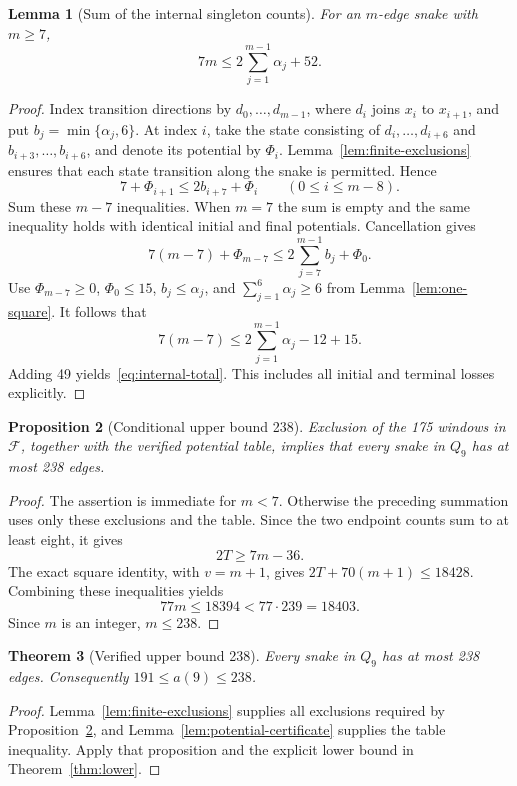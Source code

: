 \documentclass[11pt,a4paper]{article}
\newtheorem{theorem}{Theorem}[section]
\newtheorem{proposition}[theorem]{Proposition}
\newtheorem{lemma}[theorem]{Lemma}
\theoremstyle{definition}
\theoremstyle{remark}
\newcommand{\Q}{Q}
\begin{document}
\begin{lemma}[Sum of the internal singleton counts]\label{lem:internal-total}
For an $m$-edge snake with $m\ge7$,
\begin{equation}\label{eq:internal-total}
7m\le2\sum_{j=1}^{m-1}\alpha_j+52.
\end{equation}
\end{lemma}
\begin{proof}
Index transition directions by $d_0,\ldots,d_{m-1}$, where $d_i$ joins $x_i$ to $x_{i+1}$, and put $b_j=\min\{\alpha_j,6\}$. At index $i$, take the state consisting of $d_i,\ldots,d_{i+6}$ and $b_{i+3},\ldots,b_{i+6}$, and denote its potential by $\Phi_i$. Lemma~\ref{lem:finite-exclusions} ensures that each state transition along the snake is permitted. Hence
\[
7+\Phi_{i+1}\le2b_{i+7}+\Phi_i
\qquad(0\le i\le m-8).
\]
Sum these $m-7$ inequalities. When $m=7$ the sum is empty and the same inequality holds with identical initial and final potentials. Cancellation gives
\[
7(m-7)+\Phi_{m-7}\le2\sum_{j=7}^{m-1}b_j+\Phi_0.
\]
Use $\Phi_{m-7}\ge0$, $\Phi_0\le15$, $b_j\le\alpha_j$, and $\sum_{j=1}^{6}\alpha_j\ge6$ from Lemma~\ref{lem:one-square}. It follows that
\[
7(m-7)\le2\sum_{j=1}^{m-1}\alpha_j-12+15.
\]
Adding 49 yields~\eqref{eq:internal-total}. This includes all initial and terminal losses explicitly.
\end{proof}

\begin{proposition}[Conditional upper bound 238]\label{prop:direction238}
Exclusion of the 175 windows in $\mathcal F$, together with the verified potential table, implies that every snake in $\Q_9$ has at most 238 edges.
\end{proposition}
\begin{proof}
The assertion is immediate for $m<7$. Otherwise the preceding summation uses only these exclusions and the table. Since the two endpoint counts sum to at least eight, it gives
\[
2T\ge7m-36.
\]
The exact square identity, with $v=m+1$, gives $2T+70(m+1)\le18428$. Combining these inequalities yields
\[
77m\le18394<77\cdot239=18403.
\]
Since $m$ is an integer, $m\le238$.
\end{proof}

\begin{theorem}[Verified upper bound 238]\label{thm:upper238}
Every snake in $\Q_9$ has at most 238 edges. Consequently $191\le a(9)\le238$.
\end{theorem}
\begin{proof}
Lemma~\ref{lem:finite-exclusions} supplies all exclusions required by Proposition~\ref{prop:direction238}, and Lemma~\ref{lem:potential-certificate} supplies the table inequality. Apply that proposition and the explicit lower bound in Theorem~\ref{thm:lower}.
\end{proof}
\end{document}
